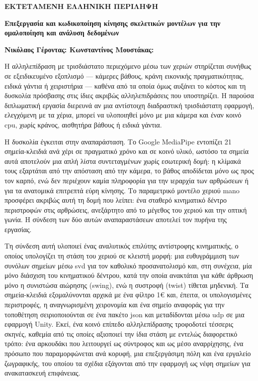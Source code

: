 \begin{center}  \Large{\textbf{ΕΚΤΕΤΑΜΕΝΗ ΕΛΛΗΝΙΚΗ ΠΕΡΙΛΗΨΗ}}  \end{center}
\begin{center}  \Large{\textbf{Επεξεργασία και κωδικοποίηση κίνησης σκελετικών
μοντέλων για την ομαλοποίηση και ανάλυση δεδομένων}}  \end{center}
\vspace{3pt}
\begin{center}  \large{\textbf{Νικόλαος Γέροντας: \hspace{50pt} Κωνσταντίνος Μουστάκας:}}  \end{center}
\vspace{10pt}
\noindent

Η αλληλεπίδραση με τρισδιάστατο περιεχόμενο μέσω των χεριών στηρίζεται
συνήθως σε εξειδικευμένο εξοπλισμό --- κάμερες βάθους, κράνη εικονικής
πραγματικότητας, ειδικά γάντια ή χειριστήρια --- καθένα από τα οποία όμως
αυξάνει το κόστος και τη δυσκολία πρόσβασης στις ίδιες ακριβώς
αλληλεπιδράσεις που υποστηρίζει. Η παρούσα διπλωματική εργασία διερευνά αν
μια αντίστοιχη διαδραστική τρισδιάστατη εφαρμογή, ελεγχόμενη με τα χέρια,
μπορεί να υλοποιηθεί μόνο με μια κάμερα και έναν κοινό
\acrshort{cpu}, χωρίς κράνος, αισθητήρα βάθους ή ειδικά γάντια.

Η δυσκολία έγκειται στην αναπαράσταση. Το Google MediaPipe εντοπίζει 21
σημεία-κλειδιά ανά χέρι σε πραγματικό χρόνο και σε κοινό υλικό, ωστόσο τα
σημεία αυτά αποτελούν μια απλή λίστα συντεταγμένων χωρίς εσωτερική δομή: η
κλίμακά τους εξαρτάται από την απόσταση από την κάμερα, το βάθος αποδίδεται
μόνο ως προς τον καρπό, ενώ δεν περιέχουν καμία πληροφορία για την ιεραρχία
των αρθρώσεων ή για τα ανατομικά επιτρεπτά εύρη κίνησης. Το παραμετρικό
μοντέλο χεριού \acrshort{mano} προσφέρει ακριβώς αυτή τη δομή που λείπει:
ένα σταθερό κινηματικό δέντρο περιστροφών στις αρθρώσεις, ανεξάρτητο από το
μέγεθος του χεριού και την οπτική γωνία. Η σύνδεση των δύο αυτών
αναπαραστάσεων αποτελεί τον πυρήνα της εργασίας.

Τη σύνδεση αυτή υλοποιεί ένας αναλυτικός επιλύτης αντίστροφης κινηματικής,
ο οποίος υπολογίζει τη στάση του χεριού σε κλειστή μορφή: μια ευθυγράμμιση
των συνόλων σημείων μέσω \acrshort{svd} για τον καθολικό προσανατολισμό και,
στη συνέχεια, μία μόνο διάσχιση του κινηματικού δέντρου, κατά την οποία ανακτάται
για κάθε άρθρωση μόνο η συνιστώσα αιώρησης (swing), ενώ η συστροφή
(twist) τίθεται μηδενική. Τα σημεία-κλειδιά εξομαλύνονται
αρχικά με ένα φίλτρο 1\euro{} και, έπειτα, οι υπολογισμένες περιστροφές, η
αναγνωρισμένη χειρονομία και ένα σημείο αναφοράς για την τοποθέτηση
σειριοποιούνται σε ένα πακέτο \acrshort{json} και μεταδίδονται μέσω
\acrshort{udp} σε μια εφαρμογή Unity. Εκεί, ένα κοινό επίπεδο αλληλεπίδρασης
τροφοδοτεί τέσσερις σκηνές, καθεμία από τις οποίες αξιοποιεί την ίδια στάση
με εντελώς διαφορετικό τρόπο: ένα αρκουδάκι που λειτουργεί ως σύντροφος και
ως μέσο αναρρίχησης, ένα πρόσωπο που παραμορφώνεται ανά κορυφή, μια
επεξεργάσιμη πόλη και ένα εργαλείο ζωγραφικής, του οποίου τα σχέδια εξάγονται
από την εφαρμογή ως νέφη σημείων για ανακατασκευή επιφάνειας.

